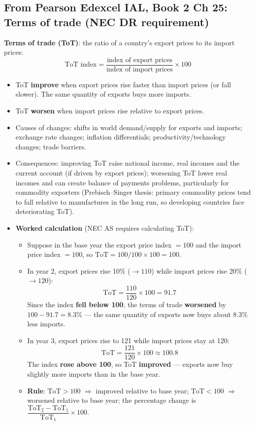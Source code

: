 \documentclass[a4paper,12pt]{article}
\newcommand{\needbold}[1]{\textcolor{red!70!black}{\textbf{#1}}}
\begin{document}
\subsection*{From Pearson Edexcel IAL, Book 2 Ch 25: Terms of trade (NEC DR requirement)}\label{sec:add-tot}
\needbold{Terms of trade (ToT)}: the ratio of a country's export prices to its import prices:
\[\text{ToT index} = \dfrac{\text{index of export prices}}{\text{index of import prices}}\times 100\]
\begin{itemize}
  \item ToT \textbf{improve} when export prices rise faster than import prices (or fall slower). The same quantity of exports buys more imports.
  \item ToT \textbf{worsen} when import prices rise relative to export prices.
  \item Causes of changes: shifts in world demand/supply for exports and imports; exchange rate changes; inflation differentials; productivity/technology changes; trade barriers.
  \item Consequences: improving ToT raise national income, real incomes and the current account (if driven by export prices); worsening ToT lower real incomes and can create balance of payments problems, particularly for commodity exporters (Prebisch--Singer thesis: primary commodity prices tend to fall relative to manufactures in the long run, so developing countries face deteriorating ToT).
  \item \textbf{Worked calculation} (NEC AS requires calculating ToT):
  \begin{itemize}
    \item Suppose in the base year the export price index $= 100$ and the import price index $= 100$, so $\text{ToT} = 100/100 \times 100 = 100$.
    \item In year 2, export prices rise 10\% ($\to 110$) while import prices rise 20\% ($\to 120$):
    \[\text{ToT} = \dfrac{110}{120} \times 100 = 91.7\]
    Since the index \textbf{fell below 100}, the terms of trade \textbf{worsened} by $100 - 91.7 = 8.3\%$ --- the same quantity of exports now buys about 8.3\% less imports.
    \item In year 3, export prices rise to 121 while import prices stay at 120:
    \[\text{ToT} = \dfrac{121}{120} \times 100 \approx 100.8\]
    The index \textbf{rose above 100}, so ToT \textbf{improved} --- exports now buy slightly more imports than in the base year.
    \item \textbf{Rule}: $\text{ToT} > 100$ $\Rightarrow$ improved relative to base year; $\text{ToT} < 100$ $\Rightarrow$ worsened relative to base year; the percentage change is $\dfrac{\text{ToT}_2 - \text{ToT}_1}{\text{ToT}_1}\times 100$.
  \end{itemize}
\end{itemize}
\end{document}

